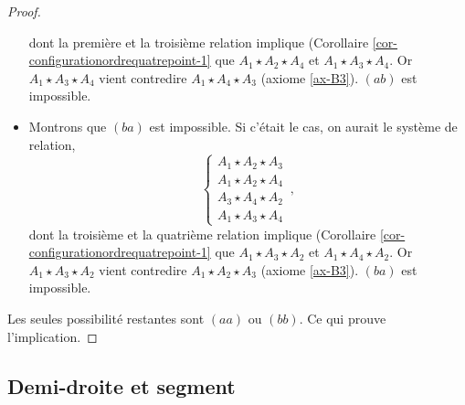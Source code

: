 \begin{cor}
\begin{proof}
\begin{itemize}[$\bullet$]
            dont la première et la troisième relation implique (Corollaire \ref{cor-configurationordrequatrepoint-1} que $A_1 \star A_2 \star A_4$ et $A_1 \star A_3 \star A_4$. Or $A_1 \star A_3 \star A_4$ vient contredire $A_1 \star A_4 \star A_3$ (axiome \ref{ax-B3}). $(ab)$ est impossible.
            \item Montrons que $(ba)$ est impossible. Si c'était le cas, on aurait le système de relation,
            \begin{equation*}
                \left\{\begin{array}{cc}
                     A_1 \star A_2 \star A_3  \\
                     A_1 \star A_2 \star A_4  \\
                     A_3 \star A_4 \star A_2 \\
                     A_1 \star A_3 \star A_4
                \end{array}\right.\,,
            \end{equation*}
            dont la troisième et la quatrième relation implique (Corollaire \ref{cor-configurationordrequatrepoint-1} que $A_1 \star A_3 \star A_2$ et $A_1 \star A_4 \star A_2$. Or $A_1 \star A_3 \star A_2$ vient contredire $A_1 \star A_2 \star A_3$ (axiome \ref{ax-B3}). $(ba)$ est impossible.
        \end{itemize}
        Les seules possibilité restantes sont $(aa)$ ou $(bb)$. Ce qui prouve l'implication.
    \end{proof}
\end{cor}

        \subsection{Demi-droite et segment}

